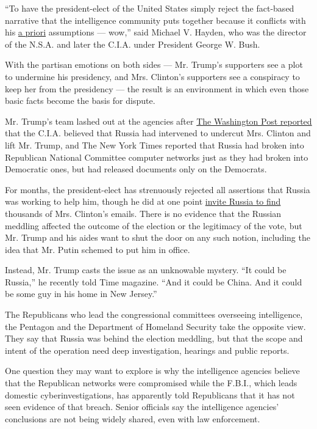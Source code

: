 ``To have the president-elect of the United States simply reject the
fact-based narrative that the intelligence community puts together
because it conflicts with his
\href{https://www.merriam-webster.com/dictionary/a\%20priori}{a priori}
assumptions --- wow,'' said Michael V. Hayden, who was the director of
the N.S.A. and later the C.I.A. under President George W. Bush.

With the partisan emotions on both sides --- Mr. Trump's supporters see
a plot to undermine his presidency, and Mrs. Clinton's supporters see a
conspiracy to keep her from the presidency --- the result is an
environment in which even those basic facts become the basis for
dispute.

Mr. Trump's team lashed out at the agencies after
\href{https://www.washingtonpost.com/world/national-security/obama-orders-review-of-russian-hacking-during-presidential-campaign/2016/12/09/31d6b300-be2a-11e6-94ac-3d324840106c_story.html?utm_term=.9195029a5343}{The
Washington Post reported} that the C.I.A. believed that Russia had
intervened to undercut Mrs. Clinton and lift Mr. Trump, and The New York
Times reported that Russia had broken into Republican National Committee
computer networks just as they had broken into Democratic ones, but had
released documents only on the Democrats.

For months, the president-elect has strenuously rejected all assertions
that Russia was working to help him, though he did at one point
\href{https://www.nytimes.com/2016/07/28/us/politics/donald-trump-russia-clinton-emails.html}{invite
Russia to find} thousands of Mrs. Clinton's emails. There is no evidence
that the Russian meddling affected the outcome of the election or the
legitimacy of the vote, but Mr. Trump and his aides want to shut the
door on any such notion, including the idea that Mr. Putin schemed to
put him in office.

Instead, Mr. Trump casts the issue as an unknowable mystery. ``It could
be Russia,'' he recently told Time magazine. ``And it could be China.
And it could be some guy in his home in New Jersey.''

The Republicans who lead the congressional committees overseeing
intelligence, the Pentagon and the Department of Homeland Security take
the opposite view. They say that Russia was behind the election
meddling, but that the scope and intent of the operation need deep
investigation, hearings and public reports.

One question they may want to explore is why the intelligence agencies
believe that the Republican networks were compromised while the F.B.I.,
which leads domestic cyberinvestigations, has apparently told
Republicans that it has not seen evidence of that breach. Senior
officials say the intelligence agencies' conclusions are not being
widely shared, even with law enforcement.

